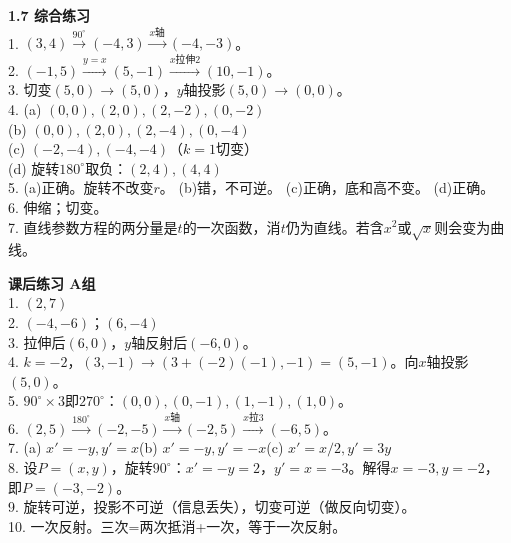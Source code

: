 \noindent\textbf{1.7 综合练习}\\
1. $(3,4)\xrightarrow{90^\circ}(-4,3)\xrightarrow{x\text{轴}}(-4,-3)$。\\
2. $(-1,5)\xrightarrow{y=x}(5,-1)\xrightarrow{x\text{拉伸}2}(10,-1)$。\\
3. 切变$(5,0)\to(5,0)$，$y$轴投影$(5,0)\to(0,0)$。\\
4. (a) $(0,0),(2,0),(2,-2),(0,-2)$\\
(b) $(0,0),(2,0),(2,-4),(0,-4)$\\
(c) $(-2,-4),(-4,-4)$（$k=1$切变）\\
(d) 旋转$180^\circ$取负：$(2,4),(4,4)$\\
5. (a)正确。旋转不改变$r$。 (b)错，不可逆。 (c)正确，底和高不变。 (d)正确。\\
6. 伸缩；切变。\\
7. 直线参数方程的两分量是$t$的一次函数，消$t$仍为直线。若含$x^2$或$\sqrt{x}$则会变为曲线。

\noindent\textbf{课后练习 A组}\\
1. $(2,7)$\\
2. $(-4,-6)$；$(6,-4)$\\
3. 拉伸后$(6,0)$，$y$轴反射后$(-6,0)$。\\
4. $k=-2$，$(3,-1)\to(3+(-2)(-1),-1)=(5,-1)$。向$x$轴投影$(5,0)$。\\
5. $90^\circ\times3$即$270^\circ$：$(0,0),(0,-1),(1,-1),(1,0)$。\\
6. $(2,5)\xrightarrow{180^\circ}(-2,-5)\xrightarrow{x\text{轴}}(-2,5)\xrightarrow{x\text{拉}3}(-6,5)$。\\
7. (a) $x'=-y,y'=x$\quad (b) $x'=-y,y'=-x$\quad (c) $x'=x/2,y'=3y$\\
8. 设$P=(x,y)$，旋转$90^\circ$：$x'=-y=2$，$y'=x=-3$。解得$x=-3,y=-2$，即$P=(-3,-2)$。\\
9. 旋转可逆，投影不可逆（信息丢失），切变可逆（做反向切变）。\\
10. 一次反射。三次=两次抵消+一次，等于一次反射。\\

